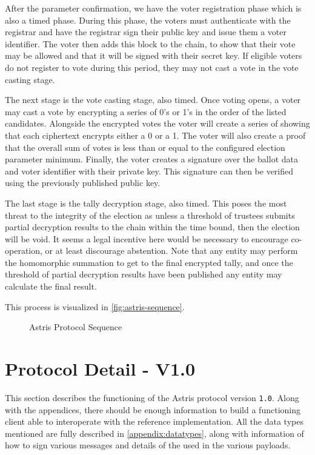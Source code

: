 After the parameter confirmation, we have the voter registration phase which is also a timed phase. During this phase, the voters must authenticate with the registrar and have the registrar sign their public key and issue them a voter identifier. The voter then adds this block to the chain, to show that their vote may be allowed and that it will be signed with their secret key. If eligible voters do not register to vote during this period, they may not cast a vote in the vote casting stage.

The next stage is the vote casting stage, also timed. Once voting opens, a voter may cast a vote by encrypting a series of 0's or 1's in the order of the listed candidates. Alongside the encrypted votes the voter will create a series of  showing that each ciphertext encrypts either a 0 or a 1. The voter will also create a proof that the overall sum of votes is less than or equal to the configured election parameter minimum. Finally, the voter creates a signature over the ballot data and voter identifier with their private key. This signature can then be verified using the previously published public key.

The last stage is the tally decryption stage, also timed. This poses the most threat to the integrity of the election as unless a threshold of trustees submits partial decryption results to the chain within the time bound, then the election will be void. It seems a legal incentive here would be necessary to encourage co-operation, or at least discourage abstention. Note that any entity may perform the homomorphic summation to get to the final encrypted tally, and once the threshold of partial decryption results have been published any entity may calculate the final result.

This process is visualized in \autoref{fig:astris-sequence}.

\begin{figure}[H]
    \centering
    
    \caption{Astris Protocol Sequence}
    \label{fig:astris-sequence}
\end{figure}

\section{Protocol Detail - V1.0}
\label{ch:astris:detail}

This section describes the functioning of the Astris protocol version \texttt{1.0}. Along with the appendices, there should be enough information to build a functioning client able to interoperate with the reference implementation. All the data types mentioned are fully described in \autoref{appendix:datatypes}, along with information of how to sign various messages and details of the  used in the various payloads.

